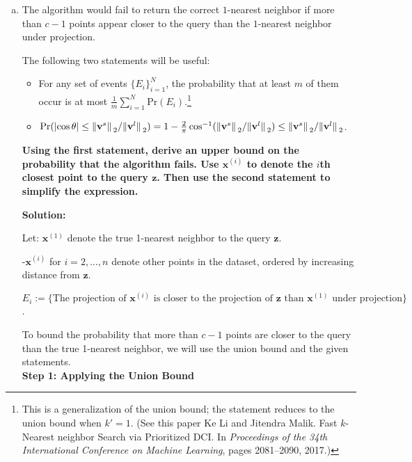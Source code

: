\documentclass{article}
\renewcommand{\vec}[1]{\boldsymbol{\mathbf{#1}}}
\newenvironment{solution}{\color{blue} \smallskip \textbf{Solution:}}{}
\begin{document}
\begin{enumerate}[(a)]
\begin{solution}
    \end{solution}

    \newpage
    \item
    The algorithm would fail to return the correct $1$-nearest neighbor if more than $c-1$ points appear closer to the query than the $1$-nearest neighbor under projection. 
    
    The following two statements will be useful:
    \begin{itemize}
        \item 
        For any set of events $\{E_{i}\} _{i=1}^{N}$, the probability that at least $m$ of them occur is at most $\frac{1}{m}\sum_{i=1}^{N}\mathrm{Pr}(E_{i})$.\footnote{This is a generalization of the union bound; the statement reduces to the union bound when $k'=1$. (See this paper Ke Li and Jitendra Malik. Fast $k$-Nearest neighbor Search via Prioritized DCI. In \emph{Proceedings of the 34th International Conference on Machine Learning}, pages 2081--2090, 2017.)}
        \item
        $\mathrm{Pr}(\abs{\cos\theta} \leq \norm*{\vec{v}^{s}}_{2} / \norm*{\vec{v}^{l}}_{2}) = 1 -\frac{2}{\pi}\cos^{-1}(\norm*{\vec{v}^{s}}_{2}/\norm*{\vec{v}^{l}}_{2}) \leq \norm*{\vec{v}^{s}}_{2}/\norm*{\vec{v}^{l}}_{2}$. 
    \end{itemize}
    {\bf Using the first statement, derive an upper bound on the probability that the algorithm fails. Use $\vec{x}^{(i)}$ to denote the $i$th closest point to the query $\vec{z}$. Then use the second statement to simplify the expression.}
    
    \begin{solution}




Let:
 \(\mathbf{x}^{(1)}\) denote the true 1-nearest neighbor to the query \(\mathbf{z}\).

-\(\mathbf{x}^{(i)}\) for \(i = 2, \dots, n\) denote other points in the dataset, ordered by increasing distance from \(\mathbf{z}\).

\( E_i := \{ \text{The projection of } \mathbf{x}^{(i)} \text{ is closer to the projection of } \mathbf{z} \text{ than } \mathbf{x}^{(1)} \text{ under projection} \} \).

To bound the probability that more than \(c - 1\) points are closer to the query than the true 1-nearest neighbor, we will use the union bound and the given statements.\\

\textbf{Step 1: Applying the Union Bound}


\end{solution}
\end{enumerate}
\end{document}
